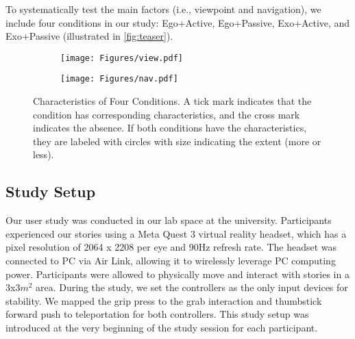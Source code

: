 To systematically test the main factors (i.e., viewpoint and navigation), we include four conditions in our study:
Ego+Active, Ego+Passive, Exo+Active, and Exo+Passive (illustrated in \autoref{fig:teaser}).


\begin{figure*}[t]
\centering
\begin{subfigure}{0.45\linewidth}
  \texttt{[image: Figures/view.pdf]}
  \caption{}
  \label{fig:view}
\end{subfigure}
\begin{subfigure}{0.45\linewidth}
  \texttt{[image: Figures/nav.pdf]}
  \caption{}
  \label{fig:nav}
\end{subfigure}
  \caption{Characteristics of Four Conditions. A tick mark indicates that the condition has corresponding characteristics, and the cross mark indicates the absence. If both conditions have the characteristics, they are labeled with circles with size indicating the extent (more or less).}
  \label{fig:characteristic}
\end{figure*}

\subsection{Study Setup}
Our user study was conducted in our lab space at the university.
Participants experienced our stories using a Meta Quest 3 virtual reality headset, which has a pixel resolution of 2064 x 2208 per eye and 90Hz refresh rate.
The headset was connected to PC via Air Link, allowing it to wirelessly leverage PC computing power.
Participants were allowed to physically move and interact with stories in a 3x3$m^2$ area.
During the study, we set the controllers as the only input devices for stability. We mapped the grip press to the grab interaction and thumbstick forward push to teleportation for both controllers.
This study setup was introduced at the very beginning of the study session for each participant.



